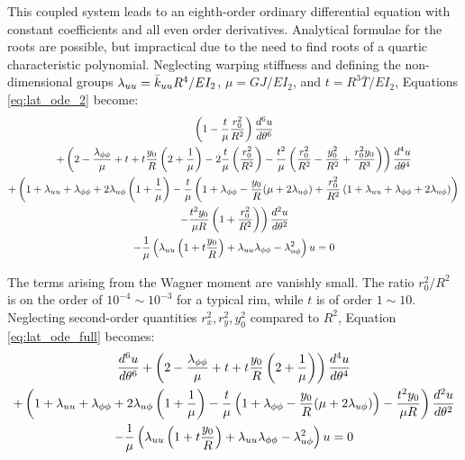 \documentclass[\rootdir/thesis.tex]{subfiles}
\begin{document}
This coupled system leads to an eighth-order ordinary differential equation with constant coefficients and all even order derivatives. Analytical formulae for the roots are possible, but impractical due to the need to find roots of a quartic characteristic polynomial. Neglecting warping stiffness and defining the non-dimensional groups $\lambda_{uu}=\bar{k}_{uu} R^4/EI_2$, $\mu=GJ/EI_2$, and $t=R^3\bar{T}/EI_2$, Equations \eqref{eq:lat_ode_2} become:
\begin{multline}
\label{eq:lat_ode_full}
  \left(1 - \frac{t}{\mu}\frac{r_0^2}{R^2}\right)\frac{d^6u}{d\theta^6}\\
  +\left(2 - \frac{\lambda_{\phi\phi}}{\mu} + t + t\frac{y_0}{R}\left(2 + \frac{1}{\mu}\right)
         -2\frac{t}{\mu}\left(\frac{r_0^2}{R^2}\right)
         -\frac{t^2}{\mu}\left(\frac{r_0^2}{R^2} - \frac{y_0^2}{R^2} +
                               \frac{r_0^2y_0}{R^3}\right) \right) \frac{d^4u}{d\theta^4}\\
  +\left(1 + \lambda_{uu} + \lambda_{\phi\phi} + 2\lambda_{u\phi}\left(1+\frac{1}{\mu}\right)
         -\frac{t}{\mu}\left(1 + \lambda_{\phi\phi}
                             -\frac{y_0}{R}(\mu + 2\lambda_{u\phi})
                             +\frac{r_0^2}{R^2}\left(1 + \lambda_{uu} + \lambda_{\phi\phi} + 2\lambda_{u\phi}\right)\right)\right.\\
         \left.-\frac{t^2y_0}{\mu R}\left(1 + \frac{r_0^2}{R^2}\right)\right)\frac{d^2u}{d\theta^2}\\
  -\frac{1}{\mu}\left(\lambda_{uu}\left(1+t\frac{y_0}{R}\right)
                      +\lambda_{uu}\lambda_{\phi\phi} - \lambda_{u\phi}^2\right)u = 0
\end{multline}

The terms arising from the Wagner moment are vanishly small. The ratio $r_0^2/R^2$ is on the order of $10^{-4}\sim10^{-3}$ for a typical rim, while $t$ is of order $1\sim10$. Neglecting second-order quantities $r_x^2,r_y^2,y_0^2$ compared to $R^2$, Equation \eqref{eq:lat_ode_full} becomes:
\begin{multline}
\label{eq:lat_ode}
  \frac{d^6u}{d\theta^6}
  +\left(2 - \frac{\lambda_{\phi\phi}}{\mu} + t + t\frac{y_0}{R}\left(2 + \frac{1}{\mu}\right)
         \right) \frac{d^4u}{d\theta^4}\\
  +\left(1 + \lambda_{uu} + \lambda_{\phi\phi} + 2\lambda_{u\phi}\left(1+\frac{1}{\mu}\right)
         -\frac{t}{\mu}\left(1 + \lambda_{\phi\phi}
                             -\frac{y_0}{R}(\mu + 2\lambda_{u\phi})
                             \right)
         -\frac{t^2y_0}{\mu R}\right)\frac{d^2u}{d\theta^2}\\
  -\frac{1}{\mu}\left(\lambda_{uu}\left(1+t\frac{y_0}{R}\right)
                      +\lambda_{uu}\lambda_{\phi\phi} - \lambda_{u\phi}^2\right)u = 0
\end{multline}
\end{document}
